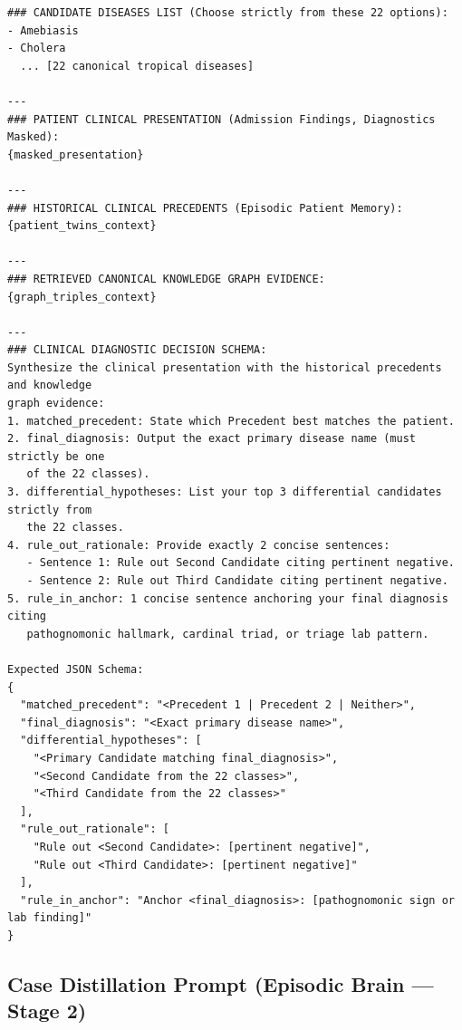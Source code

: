 \documentclass{article}
\begin{document}
\begin{promptbox}
\begin{lstlisting}[style=prompt]
### CANDIDATE DISEASES LIST (Choose strictly from these 22 options):
- Amebiasis
- Cholera
  ... [22 canonical tropical diseases]

---
### PATIENT CLINICAL PRESENTATION (Admission Findings, Diagnostics Masked):
{masked_presentation}

---
### HISTORICAL CLINICAL PRECEDENTS (Episodic Patient Memory):
{patient_twins_context}

---
### RETRIEVED CANONICAL KNOWLEDGE GRAPH EVIDENCE:
{graph_triples_context}

---
### CLINICAL DIAGNOSTIC DECISION SCHEMA:
Synthesize the clinical presentation with the historical precedents and knowledge
graph evidence:
1. matched_precedent: State which Precedent best matches the patient.
2. final_diagnosis: Output the exact primary disease name (must strictly be one
   of the 22 classes).
3. differential_hypotheses: List your top 3 differential candidates strictly from
   the 22 classes.
4. rule_out_rationale: Provide exactly 2 concise sentences:
   - Sentence 1: Rule out Second Candidate citing pertinent negative.
   - Sentence 2: Rule out Third Candidate citing pertinent negative.
5. rule_in_anchor: 1 concise sentence anchoring your final diagnosis citing
   pathognomonic hallmark, cardinal triad, or triage lab pattern.

Expected JSON Schema:
{
  "matched_precedent": "<Precedent 1 | Precedent 2 | Neither>",
  "final_diagnosis": "<Exact primary disease name>",
  "differential_hypotheses": [
    "<Primary Candidate matching final_diagnosis>",
    "<Second Candidate from the 22 classes>",
    "<Third Candidate from the 22 classes>"
  ],
  "rule_out_rationale": [
    "Rule out <Second Candidate>: [pertinent negative]",
    "Rule out <Third Candidate>: [pertinent negative]"
  ],
  "rule_in_anchor": "Anchor <final_diagnosis>: [pathognomonic sign or lab finding]"
}
\end{lstlisting}
\end{promptbox}

\subsection{Case Distillation Prompt (Episodic Brain --- Stage 2)}
\label{app:distillation_prompt}
\end{document}
